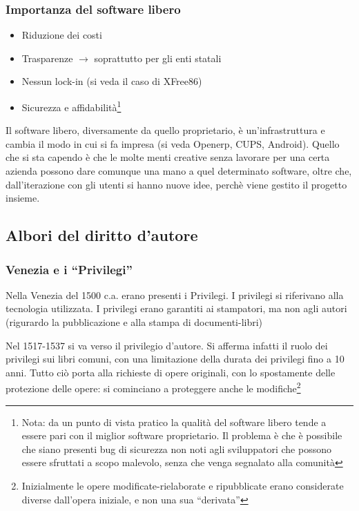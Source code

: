 \subsubsection{Importanza del software libero}

\begin{itemize}

\item Riduzione dei costi

\item Trasparenze $\to$ soprattutto per gli enti statali

\item Nessun lock-in (si veda il caso di XFree86)

\item Sicurezza e affidabilit\`a\footnote{Nota: da un punto di vista pratico la qualit\`a del software libero tende a essere pari con il miglior software proprietario. Il problema \`e che \`e possibile che siano presenti bug di sicurezza non noti agli sviluppatori che possono essere sfruttati a scopo malevolo, senza che venga segnalato alla comunit\`a}

\end{itemize}

Il software libero, diversamente da quello proprietario, \`e un'infrastruttura e cambia il modo in cui si fa impresa (si veda Openerp, CUPS, Android). Quello che si sta capendo \`e che le molte menti creative senza lavorare per una certa azienda possono dare comunque una mano a quel determinato software, oltre che, dall'iterazione con gli utenti si hanno nuove idee, perch\`e viene gestito il progetto insieme.

\subsection{Albori del diritto d'autore}

\subsubsection{Venezia e i ``Privilegi''}

Nella Venezia del 1500 c.a. erano presenti i Privilegi. I privilegi si riferivano alla tecnologia utilizzata. I privilegi erano garantiti ai stampatori, ma non agli autori (rigurardo la pubblicazione e alla stampa di documenti-libri)

Nel 1517-1537 si va verso il privilegio d'autore. Si afferma infatti il ruolo dei privilegi sui libri comuni, con una limitazione della durata dei privilegi fino a 10 anni. Tutto ci\`o porta alla richieste di opere originali, con lo spostamente delle protezione delle opere: si cominciano a proteggere anche le modifiche\footnote{Inizialmente le opere modificate-rielaborate e ripubblicate erano considerate diverse dall'opera iniziale, e non una sua ``derivata''}

